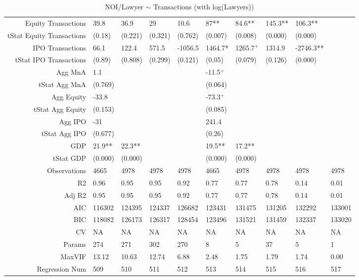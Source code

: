 \begin{table}[ht]
\begin{tabular}{rlllllllll}
  Equity Transactions & 39.8 & 36.9 & 29 & 10.6 & 87** & 84.6** & 145.3** & 106.3** &  \\ 
  tStat Equity Transactions & (0.18) & (0.221) & (0.321) & (0.762) & (0.007) & (0.008) & (0.000) & (0.000) &  \\ 
  IPO Transactions & 66.1 & 122.4 & 571.5 & -1056.5 & 1464.7* & 1265.7$^{+}$ & 1314.9 & -2746.3** &  \\ 
  tStat IPO Transactions & (0.89) & (0.808) & (0.299) & (0.121) & (0.05) & (0.079) & (0.126) & (0.000) &  \\ 
  Agg MnA & 1.1 &  &  &  & -11.5$^{+}$ &  &  &  &  \\ 
  tStat Agg MnA & (0.769) &  &  &  & (0.064) &  &  &  &  \\ 
  Agg Equity & -33.8 &  &  &  & -73.3$^{+}$ &  &  &  &  \\ 
  tStat Agg Equity & (0.153) &  &  &  & (0.085) &  &  &  &  \\ 
  Agg IPO & -31 &  &  &  & 241.4 &  &  &  &  \\ 
  tStat Agg IPO & (0.677) &  &  &  & (0.26) &  &  &  &  \\ 
  GDP & 21.9** & 22.3** &  &  & 19.5** & 17.2** &  &  &  \\ 
  tStat GDP & (0.000) & (0.000) &  &  & (0.000) & (0.000) &  &  &  \\ 
  Observations & 4665 & 4978 & 4978 & 4978 & 4665 & 4978 & 4978 & 4978 & 4978 \\ 
  R2 & 0.96 & 0.95 & 0.95 & 0.92 & 0.77 & 0.77 & 0.78 & 0.14 & 0.01 \\ 
  Adj R2 & 0.95 & 0.95 & 0.95 & 0.92 & 0.77 & 0.77 & 0.78 & 0.14 & 0.01 \\ 
  AIC & 116302 & 124395 & 124337 & 126682 & 123431 & 131475 & 131205 & 132292 & 133001 \\ 
  BIC & 118082 & 126173 & 126317 & 128454 & 123496 & 131521 & 131459 & 132337 & 133020 \\ 
  CV & NA & NA & NA & NA & NA & NA & NA & NA & NA \\ 
  Params & 274 & 271 & 302 & 270 & 8 & 5 & 37 & 5 & 1 \\ 
  MaxVIF & 13.12 & 10.63 & 12.74 & 6.88 & 2.48 & 1.75 & 1.79 & 1.74 & 0.00 \\ 
  Regression Num & 509 & 510 & 511 & 512 & 513 & 514 & 515 & 516 & 517 \\ 
   \hline
\end{tabular}
\caption{NOI/Lawyer $\sim$ Transactions (with log(Lawyers))} 
\end{table}
